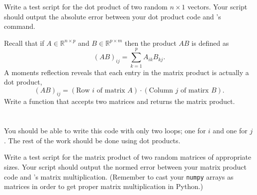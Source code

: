 \begin{problem}
    Write a test script for the dot product of two random $n \times 1$ vectors.  Your
    script should output the absolute error between your dot product code and \ProgLang's
    \ifnum{}
    \else
    \fi
    command.
\end{problem}

\begin{problem}\label{prob:matrix_mult}
    Recall that if $A \in \mathbb{R}^{n \times p}$ and $B \in \mathbb{R}^{p \times m}$
    then the product $AB$ is defined as
    \[ \left( AB \right)_{ij} = \sum_{k=1}^p A_{ik} B_{kj}. \]
    A moments reflection reveals that each entry in the matrix product is actually a dot
    product, 
    \[ \left( AB \right)_{ij} = \left( \text{Row $i$ of matrix $A$} \right) \cdot \left(
    \text{Column $j$ of matirx $B$} \right). \]
    Write a \ProgLang function that accepts two matrices and returns the matrix product. \\
    \ifnum{}
     \\
    \else
     \\
    \fi
    You
    should be able to write this code with only two loops; one for $i$ and one for $j$.
    The rest of the work should be done using dot products.
\end{problem}
\begin{problem}
    Write a test script for the matrix product of two random matrices of appropriate
    sizes.  Your script should output the normed error between your matrix product code
    and \ProgLang's matrix multiplication. \ifnum{} (Remember to cast your
    \texttt{numpy} arrays as matrices in order to get proper matrix multiplication in
    Python.)\fi
\end{problem}

